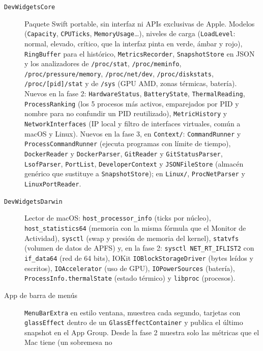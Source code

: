 \documentclass[11pt,a4paper]{article}
\begin{document}
\begin{description}
  \item[\texttt{DevWidgetsCore}] Paquete Swift portable, sin interfaz
    ni APIs exclusivas de Apple. Modelos (\texttt{Capacity},
    \texttt{CPUTicks}, \texttt{MemoryUsage}\ldots), niveles de carga
    (\texttt{LoadLevel}: normal, elevado, crítico, que la interfaz
    pinta en verde, ámbar y rojo), \texttt{RingBuffer} para el
    histórico, \texttt{MetricsRecorder}, \texttt{SnapshotStore} en
    JSON y los analizadores de \texttt{/proc/stat},
    \texttt{/proc/meminfo}, \texttt{/proc/pressure/memory},
    \texttt{/proc/net/dev}, \texttt{/proc/diskstats},
    \texttt{/proc/[pid]/stat} y de \texttt{/sys} (GPU AMD, zonas
    térmicas, batería). Nuevos en la fase 2:
    \texttt{HardwareStatus}, \texttt{BatteryState},
    \texttt{ThermalReading}, \texttt{ProcessRanking} (los 5 procesos
    más activos, emparejados por PID y nombre para no confundir un PID
    reutilizado), \texttt{MetricHistory} y
    \texttt{NetworkInterfaces} (IP local y filtro de interfaces
    virtuales, común a macOS y Linux). Nuevos en la fase 3, en
    \texttt{Context/}: \texttt{CommandRunner} y
    \texttt{ProcessCommandRunner} (ejecuta programas con límite de
    tiempo), \texttt{DockerReader} y \texttt{DockerParser},
    \texttt{GitReader} y \texttt{GitStatusParser},
    \texttt{LsofParser}, \texttt{PortList}, \texttt{DeveloperContext}
    y \texttt{JSONFileStore} (almacén genérico que sustituye a
    \texttt{SnapshotStore}); en \texttt{Linux/},
    \texttt{ProcNetParser} y \texttt{LinuxPortReader}.
  \item[\texttt{DevWidgetsDarwin}] Lector de macOS:
    \texttt{host\_processor\_info} (ticks por núcleo),
    \texttt{host\_statistics64} (memoria con la misma fórmula que el
    Monitor de Actividad), \texttt{sysctl} (swap y presión de
    memoria del kernel), \texttt{statvfs} (volumen de datos de APFS)
    y, en la fase 2: \texttt{sysctl NET\_RT\_IFLIST2} con
    \texttt{if\_data64} (red de 64 bits), IOKit
    \texttt{IOBlockStorageDriver} (bytes leídos y escritos),
    \texttt{IOAccelerator} (uso de GPU), \texttt{IOPowerSources}
    (batería), \texttt{ProcessInfo.thermalState} (estado térmico) y
    \texttt{libproc} (procesos).
  \item[App de barra de menús] \texttt{MenuBarExtra} en estilo
    ventana, muestrea cada segundo, tarjetas con
    \texttt{glassEffect} dentro de un \texttt{GlassEffectContainer}
    y publica el último snapshot en el App Group. Desde la fase 2
    muestra solo las métricas que el Mac tiene (un sobremesa no

\end{description}
\end{document}
